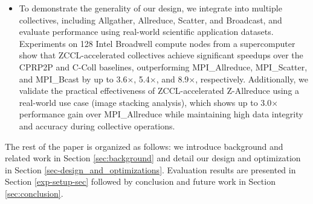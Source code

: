 \begin{itemize}
    \item To demonstrate the generality of our design, we integrate {\pname} into multiple collectives, including Allgather, Allreduce, Scatter, and Broadcast, and evaluate performance using real-world scientific application datasets. Experiments on 128 Intel Broadwell compute nodes from a supercomputer show that ZCCL-accelerated collectives achieve significant speedups over the CPRP2P and C-Coll baselines, outperforming MPI\_Allreduce, MPI\_Scatter, and MPI\_Bcast by up to 3.6$\times$, 5.4$\times$, and 8.9$\times$, respectively. Additionally, we validate the practical effectiveness of ZCCL-accelerated Z-Allreduce using a real-world use case (image stacking analysis), which shows up to 3.0$\times$ performance gain over MPI\_Allreduce while maintaining high data integrity and accuracy during collective operations.
    
\end{itemize}

The rest of the paper is organized as follows: we introduce background and related work in Section \ref{sec:background} and detail our design and optimization in Section \ref{sec-design_and_optimizations}. Evaluation results are presented in Section \ref{exp-setup-sec} followed by conclusion and future work in Section \ref{sec:conclusion}.
